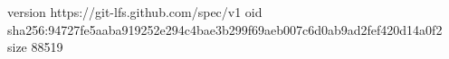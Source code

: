 version https://git-lfs.github.com/spec/v1
oid sha256:94727fe5aaba919252e294c4bae3b299f69aeb007c6d0ab9ad2fef420d14a0f2
size 88519
